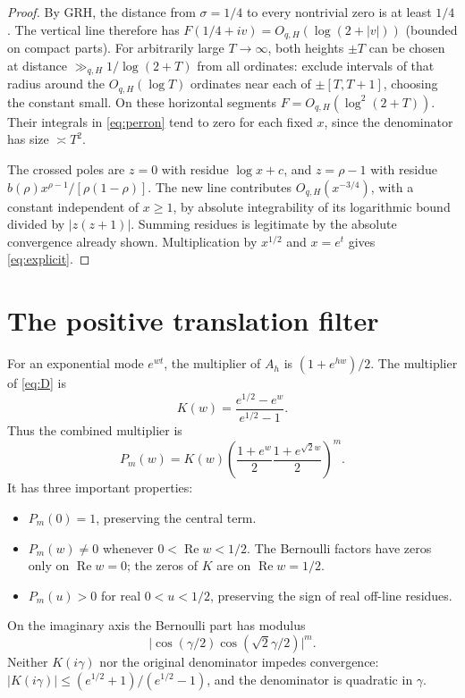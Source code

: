 \documentclass[11pt]{article}
\theoremstyle{remark}\newtheorem{remark}[theorem]{Remark}
\newcommand{\Rea}{\operatorname{Re}}
\begin{document}
\begin{proof}
By GRH, the distance from $\sigma=1/4$ to every nontrivial zero is at least $1/4$. The vertical line therefore has $F(1/4+iv)=O_{q,H}(\log(2+|v|))$ (bounded on compact parts). For arbitrarily large $T\to\infty$, both heights $\pm T$ can be chosen at distance $\gg_{q,H}1/\log(2+T)$ from all ordinates: exclude intervals of that radius around the $O_{q,H}(\log T)$ ordinates near each of $\pm[T,T+1]$, choosing the constant small. On these horizontal segments $F=O_{q,H}(\log^2(2+T))$. Their integrals in \eqref{eq:perron} tend to zero for each fixed $x$, since the denominator has size $\asymp T^2$.

The crossed poles are $z=0$ with residue $\log x+c$, and $z=\rho-1$ with residue $b(\rho)x^{\rho-1}/[\rho(1-\rho)]$. The new line contributes $O_{q,H}(x^{-3/4})$, with a constant independent of $x\ge1$, by absolute integrability of its logarithmic bound divided by $|z(z+1)|$. Summing residues is legitimate by the absolute convergence already shown. Multiplication by $x^{1/2}$ and $x=e^t$ gives \eqref{eq:explicit}.
\end{proof}

\section{The positive translation filter}
For an exponential mode $e^{wt}$, the multiplier of $A_h$ is $(1+e^{hw})/2$. The multiplier of \eqref{eq:D} is
\begin{equation}\label{eq:K}
 K(w)=\frac{e^{1/2}-e^w}{e^{1/2}-1}.
\end{equation}
Thus the combined multiplier is
\begin{equation}\label{eq:mult}
 P_m(w)=K(w)\left(\frac{1+e^w}{2}\frac{1+e^{\sqrt2 w}}{2}\right)^m.
\end{equation}
It has three important properties:
\begin{itemize}
\item $P_m(0)=1$, preserving the central term.
\item $P_m(w)\ne0$ whenever $0<\Rea w<1/2$. The Bernoulli factors have zeros only on $\Rea w=0$; the zeros of $K$ are on $\Rea w=1/2$.
\item $P_m(u)>0$ for real $0<u<1/2$, preserving the sign of real off-line residues.
\end{itemize}
On the imaginary axis the Bernoulli part has modulus
\begin{equation}\label{eq:cos}
 \big|\cos(\gamma/2)\cos(\sqrt2\gamma/2)\big|^m.
\end{equation}
Neither $K(i\gamma)$ nor the original denominator impedes convergence: $|K(i\gamma)|\le(e^{1/2}+1)/(e^{1/2}-1)$, and the denominator is quadratic in $\gamma$.
\end{document}
